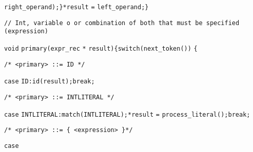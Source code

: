 \color{Tomato2}\verb$right_operand$\color{SeaGreen3}\verb$)$\color{SeaGreen3}\verb$;$\newline\tab\color{SeaGreen3}\verb$}$\newline\tab\color{DarkOrchid3}\verb$*$\color{Tomato2}\verb$result$ \color{SeaGreen3}\verb$=$ \color{Tomato2}\verb$left_operand$\color{SeaGreen3}\verb$;$\newline\color{SeaGreen3}\verb$}$\newline\newline\color{Azure4}\begin{verbatim}// Int, variable o or combination of both that must be specified (expression)\end{verbatim}\leavevmode\newline\color{Turquoise3}\verb$void$ \color{Tomato2}\verb$primary$\color{SeaGreen3}\verb$($\color{Tomato2}\verb$expr_rec$ \color{DarkOrchid3}\verb$*$ \color{Tomato2}\verb$result$\color{SeaGreen3}\verb$)$\color{SeaGreen3}\verb${$\newline\tab\color{Turquoise3}\verb$switch$\color{SeaGreen3}\verb$($\color{Tomato2}\verb$next_token$\color{SeaGreen3}\verb$($\color{SeaGreen3}\verb$)$\color{SeaGreen3}\verb$)$ \color{SeaGreen3}\verb${$\newline\tab\color{Azure4}\begin{verbatim}/* <primary> ::= ID */\end{verbatim}\leavevmode\newline\tab\color{Turquoise3}\verb$case$ \color{Tomato2}\verb$ID$\color{SeaGreen3}\verb$:$\newline\tab\tab\color{Tomato2}\verb$id$\color{SeaGreen3}\verb$($\color{Tomato2}\verb$result$\color{SeaGreen3}\verb$)$\color{SeaGreen3}\verb$;$\newline\tab\tab\color{Turquoise3}\verb$break$\color{SeaGreen3}\verb$;$\newline\tab\color{Azure4}\begin{verbatim}/* <primary> ::= INTLITERAL */\end{verbatim}\leavevmode\newline\tab\color{Turquoise3}\verb$case$ \color{Tomato2}\verb$INTLITERAL$\color{SeaGreen3}\verb$:$\newline\tab\tab\color{Tomato2}\verb$match$\color{SeaGreen3}\verb$($\color{Tomato2}\verb$INTLITERAL$\color{SeaGreen3}\verb$)$\color{SeaGreen3}\verb$;$\newline\tab\tab\color{DarkOrchid3}\verb$*$\color{Tomato2}\verb$result$ \color{SeaGreen3}\verb$=$ \color{Tomato2}\verb$process_literal$\color{SeaGreen3}\verb$($\color{SeaGreen3}\verb$)$\color{SeaGreen3}\verb$;$\newline\tab\tab\color{Turquoise3}\verb$break$\color{SeaGreen3}\verb$;$\newline\tab\color{Azure4}\begin{verbatim}/* <primary> ::= { <expression> }*/\end{verbatim}\leavevmode\newline\tab\color{Turquoise3}\verb$case$ 